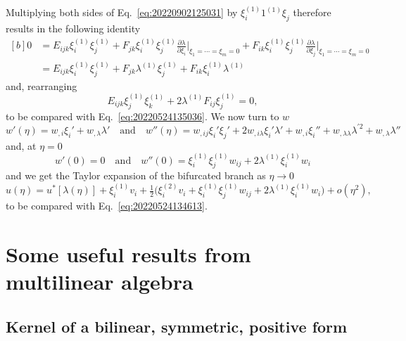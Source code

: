 \documentclass[12pt, final]{scrartcl}
\theoremstyle{definition}
\newcommand{\order}[2][1]{#2^{(#1)}}
\begin{document}
Multiplying both sides of Eq.~\eqref{eq:20220902125031} by $\order[1]{\xi_i} \order{1}{\xi_j}$ therefore results in the
following identity
\begin{equation}
  \begin{aligned}[b]
    0 &= E_{ijk} \order[1]{\xi_i} \order[1]{\xi_j} +  F_{jk} \order[1]{\xi_i} \order[1]{\xi_j} \frac{\partial\lambda}{\partial\xi_i} \biggr\rvert_{\xi_1 = \cdots = \xi_m = 0} + F_{ik} \order[1]{\xi_i} \order[1]{\xi_j} \frac{\partial\lambda}{\partial\xi_j} \biggr\rvert_{\xi_1 = \cdots = \xi_m = 0}\\
    &= E_{ijk} \order[1]{\xi_i} \order[1]{\xi_j} +  F_{jk} \order[1]{\lambda} \order[1]{\xi_j} + F_{ik} \order[1]{\xi_i} \order[1]{\lambda}
  \end{aligned}
\end{equation}
and, rearranging
\begin{equation}
  E_{ijk} \order[1]{\xi_j} \order[1]{\xi_k} +  2 \order[1]{\lambda} F_{ij}  \order[1]{\xi_j} = 0,
\end{equation}
to be compared with Eq.~\eqref{eq:20220524135036}. We now turn to $w$
\begin{equation}
  w'(\eta) = w_{,i} \xi_i' + w_{,\lambda} \lambda'
  \quad \text{and} \quad
  w''(\eta) = w_{,ij} \xi_i' \xi_j' + 2 w_{,i\lambda} \xi_i' \lambda' + w_{,i} \xi_i'' + w_{,\lambda\lambda} \lambda^{'2} + w_{,\lambda} \lambda''
\end{equation}
and, at $\eta = 0$
\begin{equation}
  w'(0) = 0 \quad \text{and} \quad w''(0) = \order[1]{\xi_i} \order[1]{\xi_j} w_{ij}  + 2 \order[1]{\lambda} \order[1]{\xi_i} w_i
\end{equation}
and we get the Taylor expansion of the bifurcated branch as $\eta \to 0$
\begin{equation}
  u(\eta) = u^\ast[\lambda(\eta)] + \order[1]{\xi_i} v_i + \tfrac{1}{2} \bigl( \order[2]{\xi_i} v_i + \order[1]{\xi_i} \order[1]{\xi_j} w_{ij}  + 2\order[1]{\lambda} \order[1]{\xi_i} w_i\bigr) + o(\eta^2),
\end{equation}
to be compared with Eq.~\eqref{eq:20220524134613}.

\appendix

\section{Some useful results from multilinear algebra}

\subsection{Kernel of a bilinear, symmetric, positive form}
\end{document}
